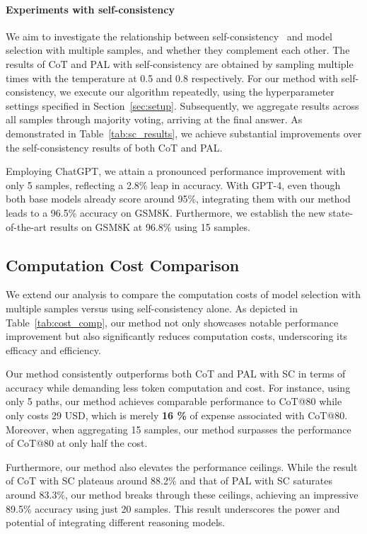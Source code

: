 \documentclass[11pt]{article}
\begin{document}
\paragraph{Experiments with self-consistency} We aim to investigate the relationship between self-consistency~\citep{Wang2022SelfConsistencyIC} and model selection with multiple samples, and whether they complement each other. The results of CoT and PAL with self-consistency are obtained by sampling multiple times with the temperature at 0.5 and 0.8 respectively. For our method with self-consistency, we execute our algorithm repeatedly, using the hyperparameter settings specified in Section~\ref{sec:setup}. Subsequently, we aggregate results across all samples through majority voting, arriving at the final answer. As demonstrated in Table~\ref{tab:sc_results}, we achieve substantial improvements over the self-consistency results of both CoT and PAL.

Employing ChatGPT, we attain a pronounced performance improvement with only 5 samples, reflecting a 2.8\% leap in accuracy. With GPT-4, even though both base models already score around 95\%, integrating them with our method leads to a 96.5\% accuracy on GSM8K. Furthermore, we establish the new state-of-the-art results on GSM8K at 96.8\% using 15 samples.


\subsection{Computation Cost Comparison}\label{sec:computation_cost}
We extend our analysis to compare the computation costs of model selection with multiple samples versus using self-consistency alone. As depicted in Table~\ref{tab:cost_comp}, our method not only showcases notable performance improvement but also significantly reduces computation costs, underscoring its efficacy and efficiency.

Our method consistently outperforms both CoT and PAL with SC in terms of accuracy while demanding less token computation and cost. For instance, using only 5 paths, our method achieves comparable performance to CoT@80 while only costs 29 USD, which is merely \textbf{16 \%} of expense associated with CoT@80. Moreover, when aggregating 15 samples, our method surpasses the performance of CoT@80 at only half the cost.

Furthermore, our method also elevates the performance ceilings. While the result of CoT with SC plateaus around 88.2\% and that of PAL with SC saturates around 83.3\%, our method breaks through these ceilings,  achieving an impressive 89.5\% accuracy using just 20 samples. This result underscores the power and potential of integrating different reasoning models.
\end{document}
